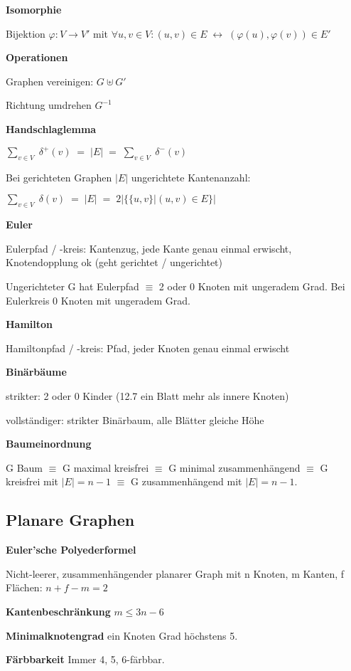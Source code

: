 \documentclass[a4paper,10pt]{article}
\begin{document}
\begin{multicols}{3}
\textbf{Isomorphie}

Bijektion $\varphi\colon V \rightarrow V'$ mit $\forall u,v \in V: (u,v) \in E \; \leftrightarrow \; (\varphi(u),\varphi(v)) \in E'$

\textbf{Operationen}

Graphen vereinigen: $G \uplus G'$ 

Richtung umdrehen $G^{-1}$

\textbf{Handschlaglemma}

$\sum_{v \in V} \; \delta^+(v) \; = \; |E| \; = \; \sum_{v \in V} \; \delta^-(v)$

Bei gerichteten Graphen $|E|$ ungerichtete Kantenanzahl:

$\sum_{v \in V} \; \delta(v) \; = \; |E| \; = \; 2| \{\{u,v\} | (u,v) \in E\}|$

\textbf{Euler}

Eulerpfad / -kreis: Kantenzug, jede Kante genau einmal erwischt, Knotendopplung ok (geht gerichtet / ungerichtet)

Ungerichteter G hat Eulerpfad $\equiv$ 2 oder 0 Knoten mit ungeradem Grad. Bei Eulerkreis 0 Knoten mit ungeradem Grad.

\textbf{Hamilton}

Hamiltonpfad / -kreis: Pfad, jeder Knoten genau einmal erwischt

\textbf{Binärbäume}

strikter: 2 oder 0 Kinder (12.7 ein Blatt mehr als innere Knoten)

vollständiger: strikter Binärbaum, alle Blätter gleiche Höhe

\textbf{Baumeinordnung}

G Baum $\equiv$ G maximal kreisfrei $\equiv$ G minimal zusammenhängend $\equiv$ G kreisfrei mit $|E|=n-1$ $\equiv$ G zusammenhängend mit $|E|=n-1$.

\subsection{Planare Graphen}

\textbf{Euler'sche Polyederformel}

Nicht-leerer, zusammenhängender planarer Graph mit n Knoten, m Kanten, f Flächen: $n+f-m = 2$

\textbf{Kantenbeschränkung} $m \leq 3n-6$

\textbf{Minimalknotengrad} ein Knoten Grad höchstens 5.

\textbf{Färbbarkeit} Immer 4, 5, 6-färbbar.


\end{multicols}
\end{document}
